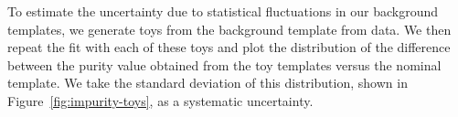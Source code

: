 To estimate the uncertainty due to statistical fluctuations in our background templates, we generate toys from the background template from data. 
We then repeat the fit with each of these toys and plot the distribution of the difference between the purity value obtained from the toy templates versus the nominal template. 
We take the standard deviation of this distribution, shown in Figure~\ref{fig:impurity-toys}, as a systematic uncertainty.

